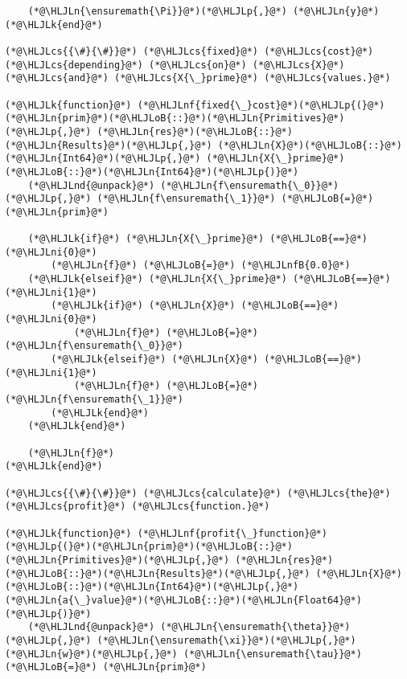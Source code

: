 \documentclass[12pt,a4paper]{article}
\newcommand{\HLJLk}[1]{\textcolor[RGB]{148,91,176}{\textbf{#1}}}
\newcommand{\HLJLn}[1]{#1}
\newcommand{\HLJLnd}[1]{\textcolor[RGB]{214,102,97}{#1}}
\newcommand{\HLJLnf}[1]{\textcolor[RGB]{66,102,213}{#1}}
\newcommand{\HLJLnfB}[1]{\textcolor[RGB]{59,151,46}{#1}}
\newcommand{\HLJLni}[1]{\textcolor[RGB]{59,151,46}{#1}}
\newcommand{\HLJLoB}[1]{\textcolor[RGB]{102,102,102}{\textbf{#1}}}
\newcommand{\HLJLp}[1]{#1}
\newcommand{\HLJLcs}[1]{\textcolor[RGB]{153,153,119}{\textit{#1}}}
\begin{document}
\begin{lstlisting}
    (*@\HLJLn{\ensuremath{\Pi}}@*)(*@\HLJLp{,}@*) (*@\HLJLn{y}@*)
(*@\HLJLk{end}@*)

(*@\HLJLcs{{\#}{\#}}@*) (*@\HLJLcs{fixed}@*) (*@\HLJLcs{cost}@*) (*@\HLJLcs{depending}@*) (*@\HLJLcs{on}@*) (*@\HLJLcs{X}@*) (*@\HLJLcs{and}@*) (*@\HLJLcs{X{\_}prime}@*) (*@\HLJLcs{values.}@*)

(*@\HLJLk{function}@*) (*@\HLJLnf{fixed{\_}cost}@*)(*@\HLJLp{(}@*)(*@\HLJLn{prim}@*)(*@\HLJLoB{::}@*)(*@\HLJLn{Primitives}@*)(*@\HLJLp{,}@*) (*@\HLJLn{res}@*)(*@\HLJLoB{::}@*)(*@\HLJLn{Results}@*)(*@\HLJLp{,}@*) (*@\HLJLn{X}@*)(*@\HLJLoB{::}@*)(*@\HLJLn{Int64}@*)(*@\HLJLp{,}@*) (*@\HLJLn{X{\_}prime}@*)(*@\HLJLoB{::}@*)(*@\HLJLn{Int64}@*)(*@\HLJLp{)}@*)
    (*@\HLJLnd{@unpack}@*) (*@\HLJLn{f\ensuremath{\_0}}@*)(*@\HLJLp{,}@*) (*@\HLJLn{f\ensuremath{\_1}}@*) (*@\HLJLoB{=}@*) (*@\HLJLn{prim}@*)

    (*@\HLJLk{if}@*) (*@\HLJLn{X{\_}prime}@*) (*@\HLJLoB{==}@*) (*@\HLJLni{0}@*)
        (*@\HLJLn{f}@*) (*@\HLJLoB{=}@*) (*@\HLJLnfB{0.0}@*)
    (*@\HLJLk{elseif}@*) (*@\HLJLn{X{\_}prime}@*) (*@\HLJLoB{==}@*) (*@\HLJLni{1}@*)
        (*@\HLJLk{if}@*) (*@\HLJLn{X}@*) (*@\HLJLoB{==}@*) (*@\HLJLni{0}@*)
            (*@\HLJLn{f}@*) (*@\HLJLoB{=}@*) (*@\HLJLn{f\ensuremath{\_0}}@*)
        (*@\HLJLk{elseif}@*) (*@\HLJLn{X}@*) (*@\HLJLoB{==}@*) (*@\HLJLni{1}@*)
            (*@\HLJLn{f}@*) (*@\HLJLoB{=}@*) (*@\HLJLn{f\ensuremath{\_1}}@*)
        (*@\HLJLk{end}@*)
    (*@\HLJLk{end}@*)

    (*@\HLJLn{f}@*)
(*@\HLJLk{end}@*)

(*@\HLJLcs{{\#}{\#}}@*) (*@\HLJLcs{calculate}@*) (*@\HLJLcs{the}@*) (*@\HLJLcs{profit}@*) (*@\HLJLcs{function.}@*)

(*@\HLJLk{function}@*) (*@\HLJLnf{profit{\_}function}@*)(*@\HLJLp{(}@*)(*@\HLJLn{prim}@*)(*@\HLJLoB{::}@*)(*@\HLJLn{Primitives}@*)(*@\HLJLp{,}@*) (*@\HLJLn{res}@*)(*@\HLJLoB{::}@*)(*@\HLJLn{Results}@*)(*@\HLJLp{,}@*) (*@\HLJLn{X}@*)(*@\HLJLoB{::}@*)(*@\HLJLn{Int64}@*)(*@\HLJLp{,}@*) (*@\HLJLn{a{\_}value}@*)(*@\HLJLoB{::}@*)(*@\HLJLn{Float64}@*)(*@\HLJLp{)}@*)
    (*@\HLJLnd{@unpack}@*) (*@\HLJLn{\ensuremath{\theta}}@*)(*@\HLJLp{,}@*) (*@\HLJLn{\ensuremath{\xi}}@*)(*@\HLJLp{,}@*) (*@\HLJLn{w}@*)(*@\HLJLp{,}@*) (*@\HLJLn{\ensuremath{\tau}}@*) (*@\HLJLoB{=}@*) (*@\HLJLn{prim}@*)


\end{lstlisting}
\end{document}
